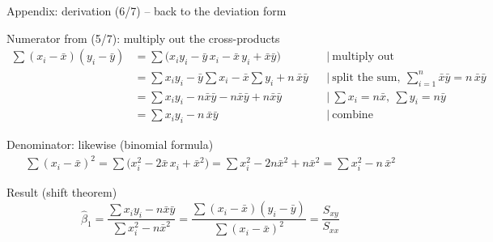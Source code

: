 \documentclass[aspectratio=169,11pt]{beamer}
\newcommand{\tsum}{\textstyle\sum}
\begin{document}
\begin{frame}{Appendix: derivation (6/7) -- back to the deviation form}
  \begin{block}{Numerator from (5/7): multiply out the cross-products}
    \vspace{-8pt}
    \footnotesize
    \begin{align*}
      \tsum (x_i - \bar{x})(y_i - \bar{y})
        &= \tsum \bigl(x_i y_i - \bar{y}\,x_i - \bar{x}\,y_i + \bar{x}\bar{y}\bigr)
         && \mid\ \text{multiply out} \\
        &= \tsum x_i y_i - \bar{y}\tsum x_i - \bar{x}\tsum y_i + n\,\bar{x}\bar{y}
         && \mid\ \text{split the sum}, \ \tsum_{i=1}^{n} \bar{x}\bar{y} = n\,\bar{x}\bar{y} \\
        &= \tsum x_i y_i - n\bar{x}\bar{y} - n\bar{x}\bar{y} + n\bar{x}\bar{y}
         && \mid\ \tsum x_i = n\bar{x}, \ \tsum y_i = n\bar{y} \\
        &= \tsum x_i y_i - n\,\bar{x}\bar{y}
         && \mid\ \text{combine}
    \end{align*}
    \vspace{-14pt}
  \end{block}

  \begin{block}{Denominator: likewise (binomial formula)}
    \vspace{-8pt}
    \footnotesize
    \begin{align*}
      \tsum (x_i - \bar{x})^{2}
        = \tsum \bigl(x_i^{2} - 2\bar{x}\,x_i + \bar{x}^{2}\bigr)
        = \tsum x_i^{2} - 2n\bar{x}^{2} + n\bar{x}^{2}
        = \tsum x_i^{2} - n\,\bar{x}^{2}
    \end{align*}
    \vspace{-14pt}
  \end{block}

  \begin{exampleblock}{Result (shift theorem)}
    \vspace{3pt}
    \[
      \hat{\beta}_1 = \frac{\tsum x_i y_i - n\bar{x}\bar{y}}{\tsum x_i^{2} - n\bar{x}^{2}}
                    = \frac{\tsum (x_i - \bar{x})(y_i - \bar{y})}{\tsum (x_i - \bar{x})^{2}}
                    = \frac{S_{xy}}{S_{xx}}
    \]
    \vspace{-10pt}
  \end{exampleblock}
\end{frame}
\end{document}
